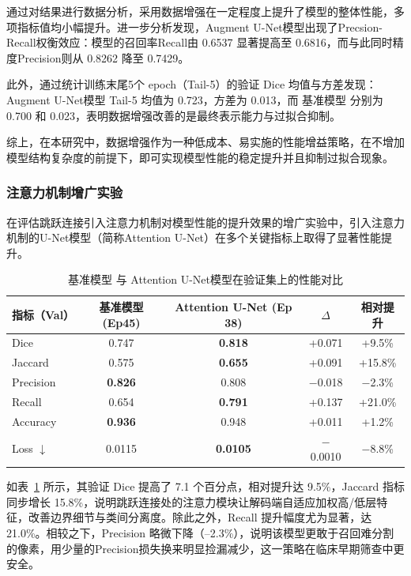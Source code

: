 通过对结果进行数据分析，采用数据增强在一定程度上提升了模型的整体性能，多项指标值均小幅提升。进一步分析发现，Augment U-Net模型出现了Precsion-Recall权衡效应：模型的召回率Recall由 0.6537 显著提高至 0.6816，而与此同时精度Precision则从 0.8262 降至 0.7429。

此外，通过统计训练末尾5个 epoch（Tail-5）的验证 Dice 均值与方差发现：Augment U-Net模型 Tail-5 均值为 0.723，方差为 0.013，而 基准模型 分别为 0.700 和 0.023，表明数据增强改善的是最终表示能力与过拟合抑制。

综上，在本研究中，数据增强作为一种低成本、易实施的性能增益策略，在不增加模型结构复杂度的前提下，即可实现模型性能的稳定提升并且抑制过拟合现象。

\subsubsection{注意力机制增广实验}

在评估跳跃连接引入注意力机制对模型性能的提升效果的增广实验中，引入注意力机制的U-Net模型（简称Attention U-Net）在多个关键指标上取得了显著性能提升。

\begin{table}[htbp]
    \centering
    \caption{基准模型 与 Attention U-Net模型在验证集上的性能对比}
    \label{tab:att_unet}
    \begin{tabular}{lcccc}
        \toprule
        指标（Val） & 基准模型 (Ep45) & Attention U-Net (Ep 38) &  $\Delta$ & 相对提升 \\
        \midrule
        Dice        & 0.747 & \textbf{0.818} & +0.071 & +9.5\% \\
        Jaccard     & 0.575 & \textbf{0.655} & +0.091 & +15.8\% \\
        Precision   & \textbf{0.826} & 0.808 & $-$0.018 & $-$2.3\% \\
        Recall      & 0.654 & \textbf{0.791} & +0.137 & +21.0\% \\
        Accuracy    & \textbf{0.936} & 0.948 & +0.011 & +1.2\% \\
        Loss $\downarrow$ & 0.0115 & \textbf{0.0105} & $-$0.0010 & $-$8.8\% \\
        \bottomrule
    \end{tabular}
\end{table}

如表~\ref{tab:att_unet} 所示，其验证 Dice 提高了 7.1 个百分点，相对提升达 9.5\%，Jaccard 指标同步增长 15.8\%，说明跳跃连接处的注意力模块让解码端自适应加权高/低层特征，改善边界细节与类间分离度。除此之外，Recall 提升幅度尤为显著，达 21.0\%。相较之下，Precision 略微下降（–2.3\%），说明该模型更敢于召回难分割的像素，用少量的Precision损失换来明显捡漏减少，这一策略在临床早期筛查中更安全。

